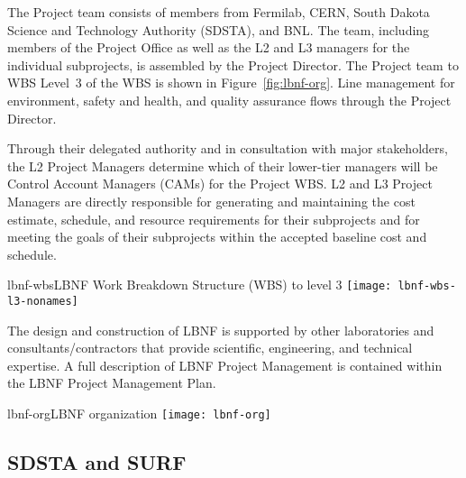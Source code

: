 The Project team consists of members from Fermilab, CERN, South Dakota Science and Technology Authority (SDSTA), and BNL.  The team, including members of the Project Office as well as the L2 and L3 managers for the individual subprojects, is assembled by the Project Director. The Project team to WBS Level~3 of the WBS is shown in Figure~\ref{fig:lbnf-org}. 
Line management for environment, safety and health, and quality assurance flows through the Project Director. 


Through their delegated authority and in consultation with major stakeholders, the L2 Project Managers determine which of their lower-tier managers will be Control Account Managers (CAMs) for the Project WBS. L2 and L3 Project Managers are directly responsible for generating and maintaining the cost estimate, schedule, and resource requirements for their subprojects and for meeting the goals of their subprojects within the accepted baseline cost and schedule. 

\begin{cdrfigure}{lbnf-wbs}{LBNF Work Breakdown Structure (WBS) to level 3}
  \texttt{[image: lbnf-wbs-l3-nonames]}
\end{cdrfigure}

The design and construction of LBNF is supported by other laboratories and consultants/contractors that provide scientific, engineering, and technical expertise. A full description of LBNF Project Management is contained within the LBNF Project Management Plan. \fixme{[ref]}

\begin{cdrfigure}{lbnf-org}{LBNF organization}
  \texttt{[image: lbnf-org]}
\end{cdrfigure}




\subsection{SDSTA and SURF}

